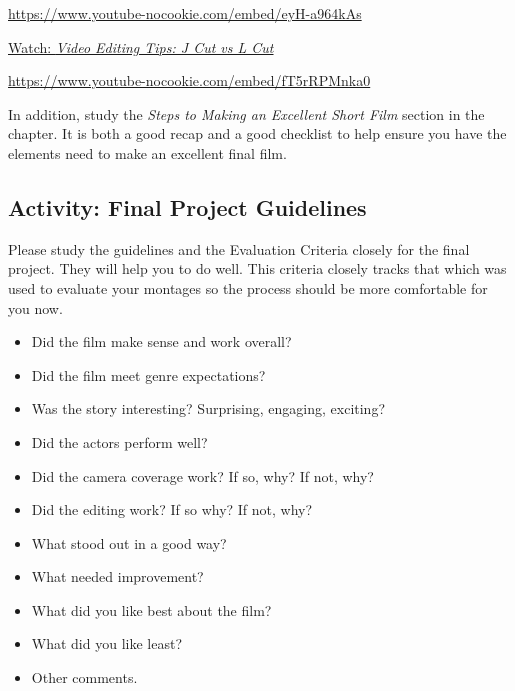 \documentclass[
  letterpaper,
  DIV=11,
  numbers=noendperiod]{scrreprt}
\providecommand{\tightlist}{%
  \setlength{\itemsep}{0pt}\setlength{\parskip}{0pt}}\usepackage{longtable,booktabs,array}
\begin{document}
\url{https://www.youtube-nocookie.com/embed/eyH-a964kAs}

\href{https://www.youtube.com/watch?v=fT5rRPMnka0}{Watch: \emph{Video
Editing Tips: J Cut vs L Cut}}

\url{https://www.youtube-nocookie.com/embed/fT5rRPMnka0}

In addition, study the \emph{Steps to Making an Excellent Short Film}
section in the chapter. It is both a good recap and a good checklist to
help ensure you have the elements need to make an excellent final film.

\subsection{Activity: Final Project
Guidelines}\label{activity-final-project-guidelines}

\begin{tcolorbox}[enhanced jigsaw, titlerule=0mm, leftrule=.75mm, bottomrule=.15mm, colback=white, left=2mm, opacitybacktitle=0.6, title={Learning Activity}, colbacktitle=quarto-callout-note-color!10!white, colframe=quarto-callout-note-color-frame, bottomtitle=1mm, toptitle=1mm, opacityback=0, rightrule=.15mm, breakable, arc=.35mm, toprule=.15mm, coltitle=black]

Please study the guidelines and the Evaluation Criteria closely for the
final project. They will help you to do well. This criteria closely
tracks that which was used to evaluate your montages so the process
should be more comfortable for you now.

\begin{itemize}
\tightlist
\item
  Did the film make sense and work overall?
\item
  Did the film meet genre expectations?
\item
  Was the story interesting? Surprising, engaging, exciting?
\item
  Did the actors perform well?
\item
  Did the camera coverage work? If so, why? If not, why?
\item
  Did the editing work? If so why? If not, why?
\item
  What stood out in a good way?
\item
  What needed improvement?
\item
  What did you like best about the film?
\item
  What did you like least?
\item
  Other comments.
\end{itemize}

\end{tcolorbox}
\end{document}
